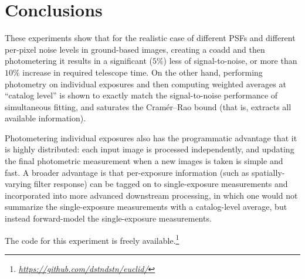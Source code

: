 \documentclass[letter,11pt]{article}
\newcommand{\niceurl}[1]{\href{#1}{\textsl{#1}}}
\begin{document}
\newpage
\section*{Conclusions}

These experiments show that for the realistic case of different PSFs
and different per-pixel noise levels in ground-based images, creating
a coadd and then photometering it results in a significant ($5\%$)
less of signal-to-noise, or more than $10\%$ increase in required
telescope time.  On the other hand, performing photometry on
individual exposures and then computing weighted averages at ``catalog
level'' is shown to exactly match the signal-to-noise performance of
simultaneous fitting, and saturates the Cram\'er--Rao bound (that is,
extracts all available information).

Photometering individual exposures also has the programmatic advantage
that it is highly distributed: each input image is processed
independently, and updating the final photometric measurement when a
new images is taken is simple and fast.  A broader advantage is that
per-exposure information (such as spatially-varying filter response)
can be tagged on to single-exposure measurements and incorporated into
more advanced downstream processing, in which one would not summarize
the single-exposure measurements with a catalog-level average, but
instead forward-model the single-exposure measurements.

The code for this experiment is freely available.\footnote{%
  \niceurl{https://github.com/dstndstn/euclid/}}
\end{document}
